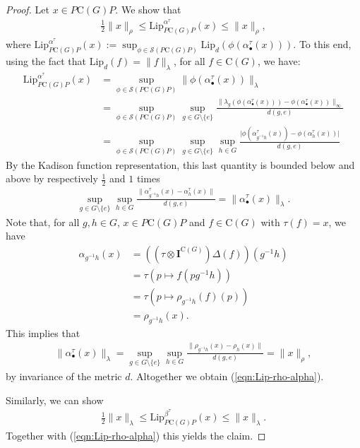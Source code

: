 \documentclass{amsart}
\theoremstyle{plain}
\theoremstyle{definition}
\theoremstyle{remark}
\begin{document}
	\begin{proof}
		Let $x \in P\mathrm{C}(G)P$.
		We show that
		\begin{align}\label{eqn:Lip-rho-alpha}
			\frac{1}{2} \lVert x \rVert_\rho 
			\leq \mathrm{Lip}^{\alpha^\tau}_{P\mathrm{C}(G)P}(x)
			\leq \lVert x \rVert_\rho,
		\end{align}
		where $\mathrm{Lip}^{\alpha^\tau}_{P\mathrm{C}(G)P}(x) := \sup_{\phi \in \mathcal{S}(P\mathrm{C}(G)P)} \mathrm{Lip}_d (\phi(\alpha^\tau_\bullet(x)))$.
		To this end, using the fact that $\mathrm{Lip}_d(f) = \lVert f \rVert_\lambda$, for all $f \in \mathrm{C}(G)$, we have:
		\begin{align}
			\mathrm{Lip}^{\alpha^\tau}_{P\mathrm{C}(G)P}(x)
			&= \sup_{\phi \in \mathcal{S}(P\mathrm{C}(G)P)} \lVert \phi(\alpha^\tau_\bullet(x)) \rVert_\lambda \\
			&= \sup_{\phi \in \mathcal{S}(P\mathrm{C}(G)P)} \sup_{g \in G \setminus \{e\}} \frac{\lVert \lambda_g(\phi(\alpha^\tau_\bullet(x))) - \phi(\alpha^\tau_\bullet(x)) \rVert_\infty}{d(g,e)} \\
			&= \sup_{\phi \in \mathcal{S}(P\mathrm{C}(G)P)} \sup_{g \in G \setminus \{e\}} \sup_{h \in G} \frac{\lvert \phi(\alpha^\tau_{g^{-1}h}(x)) - \phi(\alpha^\tau_h(x)) \rvert}{d(g,e)}
		\end{align}
		By the Kadison function representation, this last quantity is bounded below and above by respectively $\frac{1}{2}$ and $1$ times 
		\begin{align}
			\sup_{g \in G \setminus \{e\}} \sup_{h \in G} \frac{\lVert \alpha^\tau_{g^{-1}h}(x) - \alpha^\tau_h(x)\rVert}{d(g,e)}
			= \lVert \alpha^\tau_\bullet(x) \rVert_\lambda.
		\end{align}
		Note that, for all $g, h \in G$, $x \in P\mathrm{C}(G)P$ and $f \in \mathrm{C}(G)$ with $\tau(f) = x$, we have
		\begin{align}
			\alpha_{g^{-1}h}(x)
			&= ((\tau \otimes \mathbf{I}^{\mathrm{C}(G)})\Delta(f))(g^{-1}h) \\
			&= \tau(p \mapsto f(pg^{-1}h)) \\
			&= \tau(p \mapsto \rho_{g^{-1}h}(f)(p)) \\
			&= \rho_{g^{-1}h}(x).
		\end{align}
		This implies that 
		\begin{align}
			\lVert \alpha^\tau_\bullet(x) \rVert_\lambda
			= \sup_{g \in G \setminus \{e\}} \sup_{h \in G} \frac{\lVert \rho_{g^{-1}h}(x) - \rho_h(x)\rVert}{d(g,e)}
			= \|x\|_\rho,
		\end{align}
		by invariance of the metric $d$.
		Altogether we obtain (\ref{eqn:Lip-rho-alpha}).
		
		Similarly, we can show 
		\begin{align}
			\frac{1}{2} \lVert x \rVert_\lambda 
			\leq \mathrm{Lip}^{\beta^\tau}_{P\mathrm{C}(G)P}(x)
			\leq \lVert x \rVert_\lambda.
		\end{align}
		Together with (\ref{eqn:Lip-rho-alpha}) this yields the claim.
	\end{proof}
	
\end{document}

